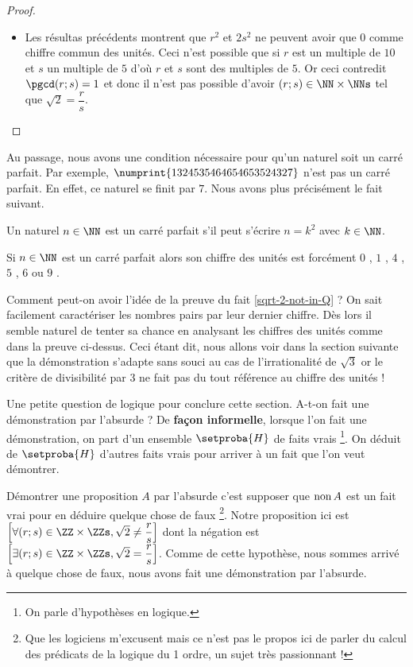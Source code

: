 \begin{proof}
\begin{itemize}[label=\small\textbullet]
		\item Les résultas précédents montrent que $r^2$ et $2 s^2$ ne peuvent avoir que $0$ comme chiffre commun des unités.
		Ceci n'est possible que si $r$ est un multiple de $10$ et $s$ un multiple de $5$ d'où $r$ et $s$ sont des multiples de $5$.
		Or ceci contredit $\pgcd(r ; s) = 1$ 
		et donc il n'est pas possible d'avoir $(r ; s) \in \NN \times \NNs$ tel que $\sqrt2 = \dfrac{r}{s}$.
	\end{itemize}
\end{proof}


Au passage, nous avons une condition nécessaire pour qu'un naturel soit un carré parfait. Par exemple, $\numprint{1324535464654653524327}$ n'est pas un carré parfait. En effet, ce naturel se finit par $7$. Nous avons plus précisément le fait suivant.


\begin{fact} \label{perfect-square-last-digit}
	Un naturel $n \in \NN$ est un carré parfait s'il peut s'écrire $n = k^2$ avec $k \in \NN$.
	
	\medskip
	
	Si $n \in \NN$ est un carré parfait alors son chiffre des unités est forcément $0$ , $1$ , $4$ , $5$  , $6$ ou $9$ .
\end{fact}


\begin{remark}
	Comment peut-on avoir l'idée de la preuve du fait \ref{sqrt-2-not-in-Q} ? 
	On sait facilement caractériser les nombres pairs par leur dernier chiffre. Dès lors il semble naturel de tenter sa chance en analysant les chiffres des unités comme dans la preuve ci-dessus.
	Ceci étant dit, nous allons voir dans la section suivante que la démonstration s'adapte sans souci au cas de l'irrationalité de $\sqrt3$ or le critère de divisibilité par $3$ ne fait pas du tout référence au chiffre des unités !
\end{remark}


\begin{remark}
	Une petite question de logique pour conclure cette section.
	A-t-on fait une démonstration par l'absurde ? 
	De \textbf{façon informelle}, lorsque l'on fait une démonstration, on part d'un ensemble $\setproba{H}$ de faits vrais
	\footnote{
		On parle d'hypothèses en logique.
	}.
	On déduit de $\setproba{H}$ d'autres faits vrais pour arriver à un fait que l'on veut démontrer.
	
	\smallskip
	
	Démontrer une proposition $A$ par l'absurde c'est supposer que $\text{\normalfont non \!} A$ est un fait vrai pour en déduire quelque chose de faux
	\footnote{
		Que les logiciens m'excusent mais ce n'est pas le propos ici de parler du calcul des prédicats de la logique du 1\ier{} ordre, un sujet très passionnant !
	}.
	Notre proposition ici est
	$\left[ \forall (r ; s) \in \ZZ \times \ZZs , \sqrt2 \neq \dfrac{r}{s} \right]$
	dont la négation est 
	$\left[ \exists (r ; s) \in \ZZ \times \ZZs , \sqrt2 = \dfrac{r}{s} \right]$.
	Comme de cette hypothèse, nous sommes arrivé à quelque chose de faux, nous avons fait une démonstration par l'absurde.	
\end{remark}

